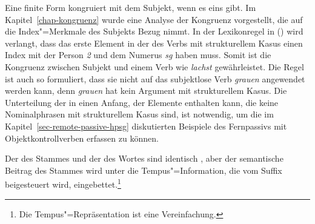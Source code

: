 Eine finite Form kongruiert mit dem Subjekt, wenn es eins gibt. Im Kapitel~\ref{chap-kongruenz}
wurde eine Analyse der Kongruenz vorgestellt, die auf die Index"=Merkmale des Subjekts Bezug nimmt.
In der Lexikonregel in () wird verlangt, dass das erste Element in der \compsl des Verbs mit
strukturellem Kasus einen Index mit der Person \emph{2} und dem Numerus \emph{sg} haben muss.
Somit ist die Kongruenz zwischen Subjekt und einem Verb wie \emph{lachst} gewährleistet. Die Regel
ist auch so formuliert, dass sie nicht auf das subjektlose Verb \emph{grauen} angewendet werden kann,
denn \emph{grauen} hat kein Argument mit strukturellem Kasus. Die Unterteilung der \compsl in einen
Anfang, der Elemente enthalten kann, die keine Nominalphrasen mit strukturellem Kasus sind, ist
notwendig, um die im Kapitel~\ref{sec-remote-passive-hpsg} diskutierten Beispiele des Fernpassivs mit
Objektkontrollverben erfassen zu können.%

Der \catw des Stammes und der \catw des Wortes sind identisch , aber der semantische
Beitrag des Stammes wird unter die Tempus"=Information, die vom Suffix beigesteuert wird,
eingebettet.\footnote{ 
  Die Tempus"=Repräsentation ist eine Vereinfachung.%
}

